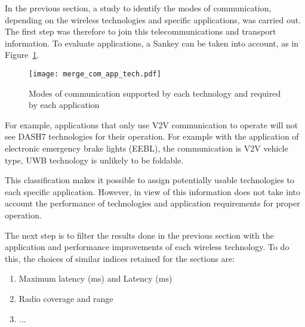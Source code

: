
In the previous section, a study to identify the modes of communication, depending on the wireless technologies and specific applications, was carried out. The first step was therefore to join this telecommunications and transport information. To evaluate applications, a Sankey can be taken into account, as in Figure~\ref{fig:fusion_comm}. %

\begin{figure}[ht!]
  \begin{center}
    \texttt{[image: merge\_com\_app\_tech.pdf]}
    \caption{Modes of communication supported by each technology and required by each application}
    \label{fig:fusion_comm}
\end{center}
\end{figure}

For example, applications that only use V2V communication to operate will not see DASH7 technologies for their operation. For example with the application of electronic emergency brake lights (EEBL), the communication is V2V vehicle type, UWB technology is unlikely to be foldable.

This classification makes it possible to assign potentially usable technologies to each specific application. However, in view of this information does not take into account the performance of technologies and application requirements for proper operation. 


The next step is to filter the results done in the previous section with the application and performance improvements of each wireless technology. 
To do this, the choices of similar indices retained for the sections are:

\begin{enumerate}
\item Maximum latency (ms) and Latency (ms)
\item Radio coverage and range
\item ...
\end{enumerate}


